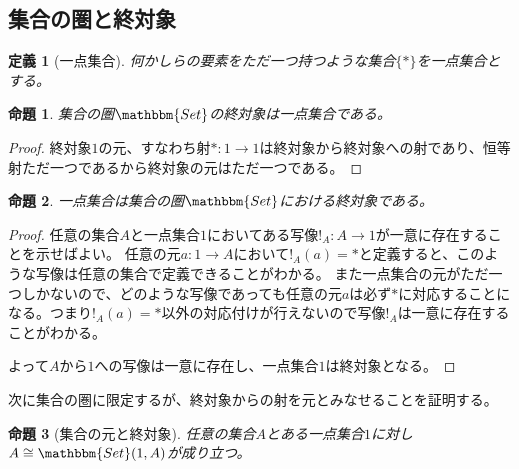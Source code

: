 \documentclass[uplatex,dvipdfmx]{jsarticle}
\newcommand{\cat}[1]{\mathbbm{#1}}
\newcommand{\arrow}{\rightarrow}
\newcommand{\mor}[3]{#1:#2\arrow #3}
\newcommand{\arset}[3]{\cat{#1}(#2,#3)}
\newtheorem{proof}{証明}[section]
\newtheorem{prop}{命題}[section]
\newtheorem{define}{定義}[section]
\numberwithin{proof}{subsection}
\numberwithin{prop}{subsection}
\numberwithin{define}{subsection}
\begin{document}
  \subsection{集合の圏と終対象}
	\begin{define}[一点集合]
		何かしらの要素をただ一つ持つような集合$\{*\}$を一点集合とする。
	\end{define}
	\begin{prop}
		集合の圏$\cat{Set}$の終対象は一点集合である。
	\end{prop}
	\begin{proof}
		終対象$1$の元、すなわち射$\mor{*}{1}{1}$は終対象から終対象への射であり、恒等射ただ一つであるから終対象の元はただ一つである。
	\end{proof}
	\begin{prop}
		一点集合は集合の圏$\cat{Set}$における終対象である。
	\end{prop}
	\begin{proof}
		任意の集合$A$と一点集合$1$においてある写像$\mor{!_A}{A}{1}$が一意に存在することを示せばよい。
		任意の元$\mor{a}{1}{A}$において$!_A(a)=*$と定義すると、このような写像は任意の集合で定義できることがわかる。
		また一点集合の元がただ一つしかないので、どのような写像であっても任意の元$a$は必ず$*$に対応することになる。つまり$!_A(a)=*$以外の対応付けが行えないので写像$!_A$は一意に存在することがわかる。

		よって$A$から$1$への写像は一意に存在し、一点集合$1$は終対象となる。
	\end{proof}
	次に集合の圏に限定するが、終対象からの射を元とみなせることを証明する。
	\begin{prop}[集合の元と終対象]
		任意の集合$A$とある一点集合$1$に対し$A\cong\arset{Set}{1}{A}$が成り立つ。
	\end{prop}
\end{document}
